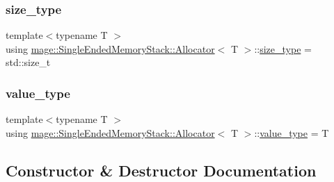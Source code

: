 \subsubsection{\texorpdfstring{size\+\_\+type}{size\_type}}
{\footnotesize\ttfamily template$<$typename T $>$ \\
using \mbox{\hyperlink{classmage_1_1_single_ended_memory_stack_1_1_allocator}{mage\+::\+Single\+Ended\+Memory\+Stack\+::\+Allocator}}$<$ T $>$\+::\mbox{\hyperlink{classmage_1_1_single_ended_memory_stack_1_1_allocator_a4433de74b466aa720a40f4d29469e0f9}{size\+\_\+type}} =  std\+::size\+\_\+t}

\mbox{\label{classmage_1_1_single_ended_memory_stack_1_1_allocator_a1dafabb56c4b51ad6bfc19769f48c8be}} 
\subsubsection{\texorpdfstring{value\+\_\+type}{value\_type}}
{\footnotesize\ttfamily template$<$typename T $>$ \\
using \mbox{\hyperlink{classmage_1_1_single_ended_memory_stack_1_1_allocator}{mage\+::\+Single\+Ended\+Memory\+Stack\+::\+Allocator}}$<$ T $>$\+::\mbox{\hyperlink{classmage_1_1_single_ended_memory_stack_1_1_allocator_a1dafabb56c4b51ad6bfc19769f48c8be}{value\+\_\+type}} =  T}



\subsection{Constructor \& Destructor Documentation}
\mbox{\label{classmage_1_1_single_ended_memory_stack_1_1_allocator_abcbc435ff81182693d19aef11e6b4983}} 
